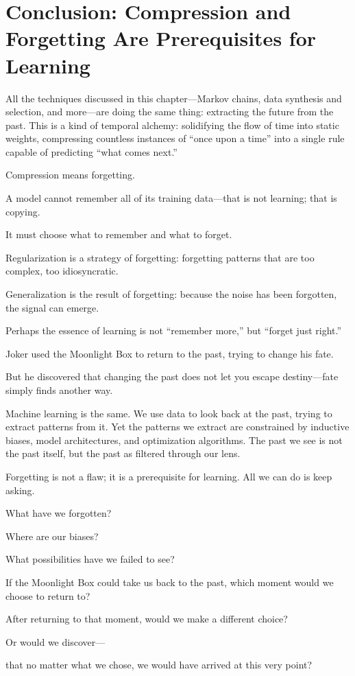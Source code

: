 \newpage
\section{Conclusion: Compression and Forgetting Are Prerequisites for Learning}

All the techniques discussed in this chapter---Markov chains, data synthesis and selection, and more---are doing the same thing: extracting the future from the past.
This is a kind of temporal alchemy: solidifying the flow of time into static weights, compressing countless instances of ``once upon a time'' into a single rule capable of predicting ``what comes next.''

\vspace{1em}

Compression means forgetting.

A model cannot remember all of its training data---that is not learning; that is copying.

It must choose what to remember and what to forget.

Regularization is a strategy of forgetting: forgetting patterns that are too complex, too idiosyncratic.

Generalization is the result of forgetting: because the noise has been forgotten, the signal can emerge.

Perhaps the essence of learning is not ``remember more,'' but ``forget just right.''

\vspace{1em}

Joker used the Moonlight Box to return to the past, trying to change his fate.

But he discovered that changing the past does not let you escape destiny---fate simply finds another way.

\vspace{1em}

Machine learning is the same.
We use data to look back at the past, trying to extract patterns from it. Yet the patterns we extract are constrained by inductive biases, model architectures, and optimization algorithms. The past we see is not the past itself, but the past as filtered through our lens.

\vspace{1em}

Forgetting is not a flaw; it is a prerequisite for learning. All we can do is keep asking.

What have we forgotten?

Where are our biases?

What possibilities have we failed to see?

\begin{thinkbox}
If the Moonlight Box could take us back to the past, which moment would we choose to return to?

After returning to that moment, would we make a different choice?

Or would we discover---

that no matter what we chose, we would have arrived at this very point?
\end{thinkbox}
